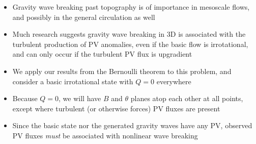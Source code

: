 \documentclass[30pt,landscape]{foils}
\begin{document}
\hypersetup{pdfpagetransition=Replace}

\begin{itemize}
  \item Gravity wave breaking past topography is of importance in mesoscale flows, and possibly in the general circulation as well

  \item Much research suggests gravity wave breaking in 3D is associated with the turbulent production of PV anomalies, even if the basic flow is irrotational, and can only occur if the turbulent PV flux is upgradient

  \item We apply our results from the Bernoulli theorem to this problem, and consider a basic irrotational state with $Q = 0$ everywhere

  \item Because $Q = 0$, we will have $B$ and $\theta$ planes atop each other at all points, except where turbulent (or otherwise forces) PV fluxes are present

  \item Since the basic state nor the generated gravity waves have any PV, observed PV fluxes \emph{must} be associated with nonlinear wave breaking

\end{itemize}

\hypersetup{pdfpagetransition=Replace}
\end{document}
